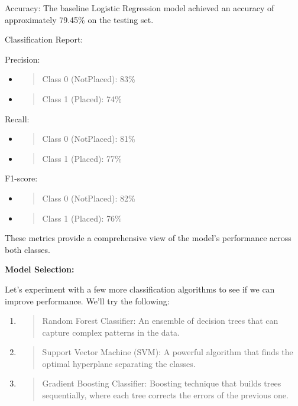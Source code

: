 \documentclass[]{article}
\begin{document}
Accuracy: The baseline Logistic Regression model achieved an accuracy of
approximately 79.45\% on the testing set.

Classification Report:

Precision:

\begin{itemize}
\item
  \begin{quote}
  Class 0 (NotPlaced): 83\%
  \end{quote}
\item
  \begin{quote}
  Class 1 (Placed): 74\%
  \end{quote}
\end{itemize}

Recall:

\begin{itemize}
\item
  \begin{quote}
  Class 0 (NotPlaced): 81\%
  \end{quote}
\item
  \begin{quote}
  Class 1 (Placed): 77\%
  \end{quote}
\end{itemize}

F1-score:

\begin{itemize}
\item
  \begin{quote}
  Class 0 (NotPlaced): 82\%
  \end{quote}
\item
  \begin{quote}
  Class 1 (Placed): 76\%
  \end{quote}
\end{itemize}

These metrics provide a comprehensive view of the model's performance
across both classes.

\textbf{Model Selection:}

Let's experiment with a few more classification algorithms to see if we
can improve performance. We'll try the following:

\begin{enumerate}
\def\labelenumi{\arabic{enumi}.}
\item
  \begin{quote}
  Random Forest Classifier: An ensemble of decision trees that can
  capture complex patterns in the data.
  \end{quote}
\item
  \begin{quote}
  Support Vector Machine (SVM): A powerful algorithm that finds the
  optimal hyperplane separating the classes.
  \end{quote}
\item
  \begin{quote}
  Gradient Boosting Classifier: Boosting technique that builds trees
  sequentially, where each tree corrects the errors of the previous one.
  \end{quote}
\end{enumerate}
\end{document}
